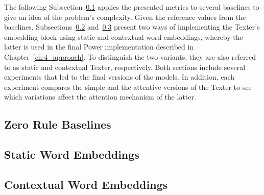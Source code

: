 The following Subsection~\ref{subsec:5_experiments/4_texter/1_zero_rule} applies the presented metrics to several baselines to give an idea of the problem's complexity. Given the reference values from the baselines, Subsections~\ref{subsec:5_experiments/4_texter/2_static} and~\ref{subsec:5_experiments/4_texter/3_context} present two ways of implementing the Texter's embedding block using static and contextual word embeddings, whereby the latter is used in the final Power implementation described in Chapter~\ref{ch:4_approach}. To distinguish the two variants, they are also referred to as static and contextual Texter, respectively. Both sections include several experiments that led to the final versions of the models. In addition, each experiment compares the simple and the attentive versions of the Texter to see which variations affect the attention mechanism of the latter.

\subsection{Zero Rule Baselines}
\label{subsec:5_experiments/4_texter/1_zero_rule}


\subsection{Static Word Embeddings}
\label{subsec:5_experiments/4_texter/2_static}


\subsection{Contextual Word Embeddings}
\label{subsec:5_experiments/4_texter/3_context}

